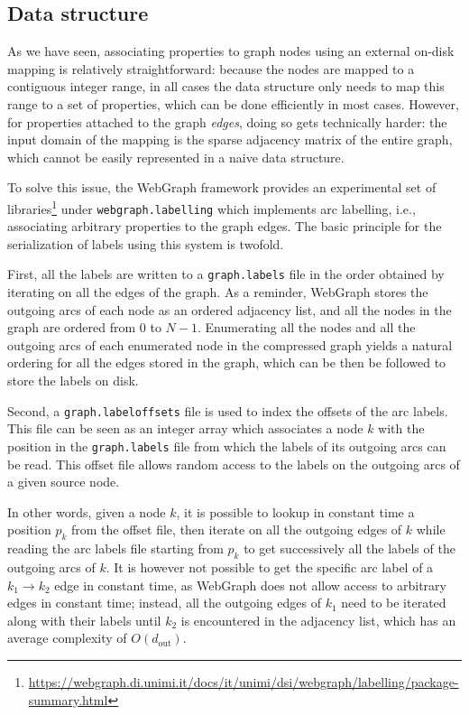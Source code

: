 \subsection{Data structure}%
\label{sec:label-data-structure}

As we have seen, associating properties to graph nodes using an external
on-disk mapping is relatively straightforward: because the nodes are mapped to
a contiguous integer range, in all cases the data structure only needs to map
this range to a set of properties, which can be done efficiently in most cases.
However, for properties attached to the graph \emph{edges}, doing so gets
technically harder: the input domain of the mapping is the sparse adjacency
matrix of the entire graph, which cannot be easily represented in a naive data
structure.

To solve this issue, the WebGraph framework provides an experimental set of
libraries\footnote{\url{https://webgraph.di.unimi.it/docs/it/unimi/dsi/webgraph/labelling/package-summary.html}}
under \texttt{webgraph.labelling} which implements arc labelling, i.e.,
associating arbitrary properties to the graph edges. The basic principle for
the serialization of labels using this system is twofold.

First, all the labels
are written to a \texttt{graph.labels} file in the order obtained by iterating
on all the edges of the graph.  As a reminder, WebGraph stores the outgoing
arcs of each node as an ordered adjacency list, and all the nodes in the graph
are ordered from $0$ to $N-1$.  Enumerating all the nodes and all the outgoing
arcs of each enumerated node in the compressed graph yields a natural ordering
for all the edges stored in the graph, which can be then be followed to store
the labels on disk.

Second, a \texttt{graph.labeloffsets} file is used to index the offsets of the
arc labels. This file can be seen as an integer array which associates a node
$k$ with the position in the \texttt{graph.labels} file from which the labels
of its outgoing arcs can be read. This offset file allows random access to the
labels on the outgoing arcs of a given source node.

In other words, given a node $k$, it is possible to lookup in constant time
a position $p_k$ from the offset file, then iterate on all the outgoing edges
of $k$ while reading the arc labels file starting from $p_k$ to get
successively all the labels of the outgoing arcs of $k$. It is however not
possible to get the specific arc label of a $k_1 \to k_2$ edge in constant
time, as WebGraph does not allow access to arbitrary edges in constant time;
instead, all the outgoing edges of $k_1$ need to be iterated along with their
labels until $k_2$ is encountered in the adjacency list, which has an average
complexity of $O(d_{\mathrm{out}})$.

